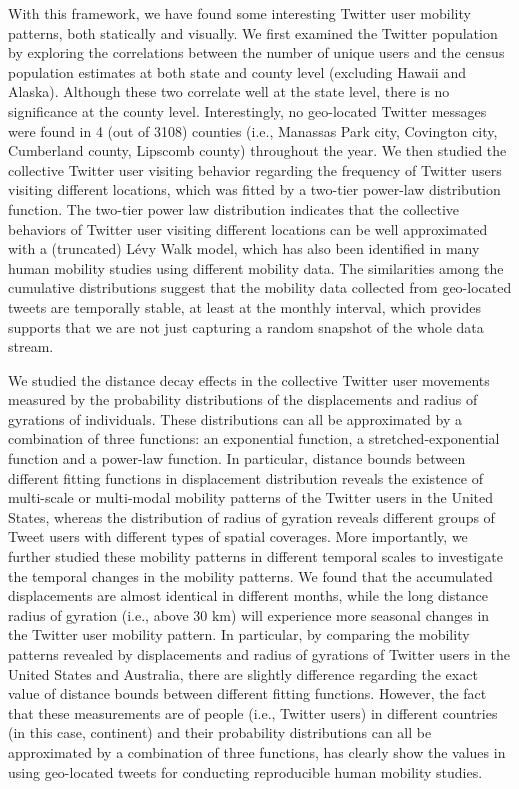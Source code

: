 \documentclass[a4paper, 11pt]{article}
\begin{document}
With this framework, we have found some interesting Twitter user mobility patterns, both statically and visually.
We first examined the Twitter population by exploring the correlations between the number of unique users and the census population estimates at both state and county level (excluding Hawaii and Alaska). 
Although these two correlate well at the state level, there is no significance at the county level. 
Interestingly, no geo-located Twitter messages were found in 4 (out of 3108) counties (i.e., Manassas Park city, Covington city, Cumberland county, Lipscomb county) throughout the year.
We then studied the collective Twitter user visiting behavior regarding the frequency of Twitter users visiting different locations, which was fitted by a two-tier power-law distribution function.
The two-tier power law distribution indicates that the collective behaviors of Twitter user visiting different locations can be well approximated with a (truncated) L\'{e}vy Walk model, which has also been identified in many human mobility studies using different mobility data.
The similarities among the cumulative distributions suggest that the mobility data collected from geo-located tweets are temporally stable, at least at the monthly interval, which provides supports that we are not just capturing a random snapshot of the whole data stream. 

We studied the distance decay effects in the collective Twitter user movements measured by the probability distributions of the displacements and radius of gyrations of individuals. 
These distributions can all be approximated by a combination of three functions: an exponential function, a stretched-exponential function and a power-law function. In particular, distance bounds between different fitting functions in displacement distribution reveals the existence of multi-scale or multi-modal mobility patterns of the Twitter users in the United States, whereas the distribution of radius of gyration reveals different groups of Tweet users with different types of spatial coverages.   
More importantly, we further studied these mobility patterns in different temporal scales to investigate the temporal changes in the mobility patterns. 
We found that the accumulated displacements are almost identical in different months, while the long distance radius of gyration (i.e., above 30 km) will experience more seasonal changes in the Twitter user mobility pattern.
In particular, by comparing the mobility patterns revealed by displacements and radius of gyrations of Twitter users in the United States and Australia, there are slightly difference regarding the exact value of distance bounds between different fitting functions. 
However, the fact that these measurements are of people (i.e., Twitter users) in different countries (in this case, continent) and their probability distributions can all be approximated by a combination of three functions, has clearly show the values in using geo-located tweets for conducting reproducible human mobility studies. 


\cleardoublepage
%



\end{document}
